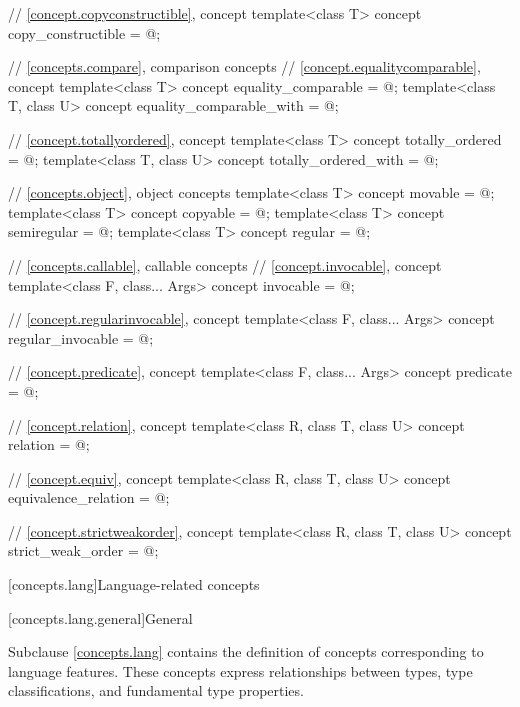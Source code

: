\begin{codeblock}
{  // \ref{concept.copyconstructible}, concept 
  template<class T>
    concept copy_constructible = @\seebelow@;

  // \ref{concepts.compare}, comparison concepts
  // \ref{concept.equalitycomparable}, concept 
  template<class T>
    concept equality_comparable = @\seebelow@;
  template<class T, class U>
    concept equality_comparable_with = @\seebelow@;

  // \ref{concept.totallyordered}, concept 
  template<class T>
    concept totally_ordered = @\seebelow@;
  template<class T, class U>
    concept totally_ordered_with = @\seebelow@;

  // \ref{concepts.object}, object concepts
  template<class T>
    concept movable = @\seebelow@;
  template<class T>
    concept copyable = @\seebelow@;
  template<class T>
    concept semiregular = @\seebelow@;
  template<class T>
    concept regular = @\seebelow@;

  // \ref{concepts.callable}, callable concepts
  // \ref{concept.invocable}, concept 
  template<class F, class... Args>
    concept invocable = @\seebelow@;

  // \ref{concept.regularinvocable}, concept 
  template<class F, class... Args>
    concept regular_invocable = @\seebelow@;

  // \ref{concept.predicate}, concept 
  template<class F, class... Args>
    concept predicate = @\seebelow@;

  // \ref{concept.relation}, concept 
  template<class R, class T, class U>
    concept relation = @\seebelow@;

  // \ref{concept.equiv}, concept 
  template<class R, class T, class U>
    concept equivalence_relation = @\seebelow@;

  // \ref{concept.strictweakorder}, concept 
  template<class R, class T, class U>
    concept strict_weak_order = @\seebelow@;
}
\end{codeblock}

[concepts.lang]{Language-related concepts}

[concepts.lang.general]{General}

\pnum
Subclause \ref{concepts.lang} contains the definition of concepts corresponding to language
features. These concepts express relationships between types, type
classifications, and fundamental type properties.

